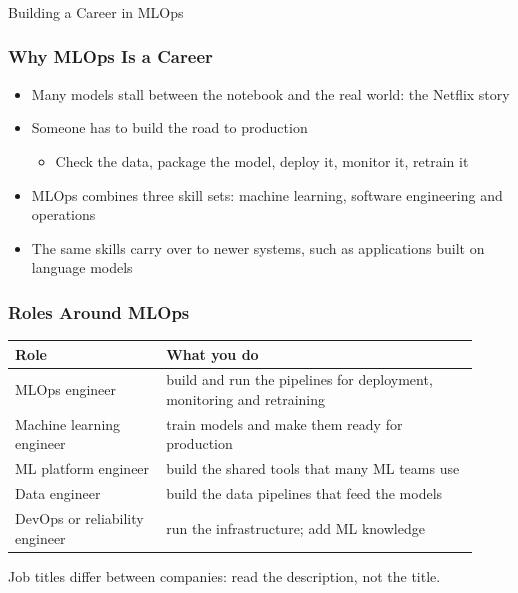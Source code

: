 \begin{frame}[fragile]\frametitle{}
\begin{center}
{\Large Building a Career in MLOps}
\end{center}
\end{frame}

\begin{frame}[fragile]\frametitle{Why MLOps Is a Career}
\begin{itemize}
\item Many models stall between the notebook and the real world: the Netflix story
\item Someone has to build the road to production
\begin{itemize}
\item Check the data, package the model, deploy it, monitor it, retrain it
\end{itemize}
\item MLOps combines three skill sets: machine learning, software engineering and operations
\item The same skills carry over to newer systems, such as applications built on language models
\end{itemize}
\end{frame}

\begin{frame}[fragile]\frametitle{Roles Around MLOps}
\begin{center}
\small\renewcommand{\arraystretch}{1.35}
\begin{tabular}{>{\raggedright\arraybackslash}p{0.3\linewidth}>{\raggedright\arraybackslash}p{0.62\linewidth}}
\hline
\textbf{Role} & \textbf{What you do} \\
\hline
MLOps engineer & build and run the pipelines for deployment, monitoring and retraining \\
Machine learning engineer & train models and make them ready for production \\
ML platform engineer & build the shared tools that many ML teams use \\
Data engineer & build the data pipelines that feed the models \\
DevOps or reliability engineer & run the infrastructure; add ML knowledge \\
\hline
\end{tabular}
\end{center}
Job titles differ between companies: read the description, not the title.
\end{frame}

